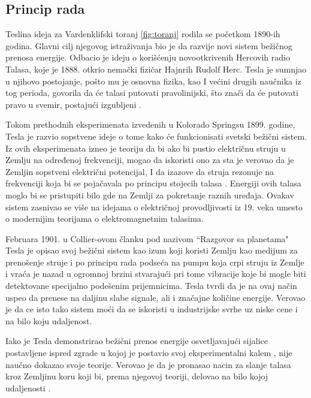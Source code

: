 \documentclass[a4paper]{article}
\begin{document}
\subsection{Princip rada}
\label{subsec:principrada}
Teslina ideja za Vardenklifski toranj \ref{fig:toranj} rodila se početkom 1890-ih godina. Glavni cilj njegovog istraživanja bio je da razvije novi sistem bežičnog prenosa energije. Odbacio je ideju o korišćenju novootkrivenih Hercovih radio Talasa, koje je 1888. otkrio nemački fizičar Hajnrih Rudolf Herc. Tesla je sumnjao u njihovo postojanje, pošto mu je osnovna fizika, kao I većini drugih naučnika iz tog perioda, govorila da će talasi  putovati pravolinijski, što znači da će putovati pravo u svemir, postajući izgubljeni \cite{izgubljeniTalasi}.

Tokom prethodnih eksperimenata izvedenih u Kolorado Springsu 1899. godine, Tesla je razvio sopstvene ideje o tome kako će funkcionisati svetski bežični sistem. Iz ovih eksperimenata izneo je teoriju da bi ako bi pustio električnu struju u Zemlju na određenoj frekvenciji, mogao da iskoristi ono za sta je verovao da je Zemljin sopstveni električni potencijal, I da izazove da struja rezonuje na frekvenciji koja bi se pojačavala po principu stojecih talasa \cite{stojeciTalasi}. Energiji ovih talasa moglo bi se pristupiti bilo gde na Zemlji za pokretanje raznih uređaja. Ovakav sistem zasnivao se više na idejama o električnoj provodljivosti iz 19. veka umesto o modernijim teorijama o elektromagnetnim talasima.
	
Februara 1901. u Collier-ovom članku pod nazivom “Razgovor sa planetama" \cite{razgovorsaplanetama} Tesla je opisao svoj bežični sistem kao izum koji koristi Zemlju kao medijum za prenošenje struje i po principu rada podseća na pumpu koja crpi struju iz Zemlje i vraća je nazad u ogromnoj brzini stvarajući pri tome vibracije koje bi mogle biti detektovane specijalno podešenim prijemnicima. Tesla tvrdi da je na ovaj način uspeo da prenese na daljinu slabe signale, ali i značajne količine energije. Verovao je da ce isto tako sistem moći da se iskoristi u industrijske svrhe uz niske cene i na bilo koju udaljenost. 

Iako je Tesla demonstrirao bežični prenos energije osvetljavajući sijalice postavljene ispred zgrade u kojoj je postavio svoj eksperimentalni kalem \cite{teslinClanak}, nije naučno dokazao svoje teorije. Verovao je da je pronasao nacin za slanje talasa kroz Zemljinu koru koji bi, prema njegovoj teoriji, delovao na bilo kojoj udaljenosti \cite{teorija}.
\end{document}
